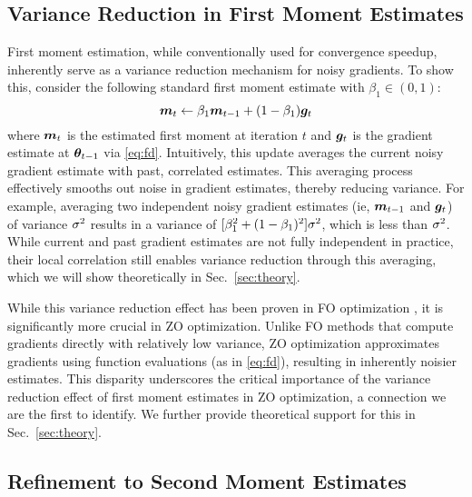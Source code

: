 \subsection{Variance Reduction in First Moment Estimates}\label{sec:1st-mo}
First moment estimation, while conventionally used for convergence speedup, inherently serve as a variance reduction mechanism for noisy gradients. To show this, consider the following standard first moment estimate with $\beta_1 \in (0,1)$:
\begin{equation}\label{eq:1st-mo}
{\bm{m}}_t \gets \beta_1{\bm{m}}_{t-1} + (1-\beta_1){\bm{g}}_{t}
\end{equation}
where ${\bm{m}}_t$ is the estimated first moment at iteration $t$ and ${\bm{g}}_t$ is the gradient estimate at ${\bm{\theta}}_{t-1}$ via \eqref{eq:fd}.  Intuitively, this update averages the current noisy gradient estimate with past, correlated estimates.
This averaging process effectively smooths out noise in gradient estimates, thereby reducing variance. For example, averaging two independent noisy gradient estimates (ie, ${\bm{m}}_{t-1}$ and ${\bm{g}}_t$) of variance $\sigma^{\smash{2}}$ results in a variance of $[\beta_1^{\smash{2}} + (1-\beta_1)^{\smash{2}}]\sigma^{\smash{2}}$, which is less than $\sigma^{\smash{2}}$. While current and past gradient estimates are not fully independent in practice, their local correlation still enables variance reduction through this averaging, which we will show theoretically in Sec.~\ref{sec:theory}.

While this variance reduction effect has been proven in FO optimization \citep{sgdm}, it is significantly more crucial in ZO optimization. Unlike FO methods that compute gradients directly with relatively low variance, ZO optimization approximates gradients using function evaluations (as in \eqref{eq:fd}), resulting in inherently noisier estimates. This disparity underscores the critical importance of the variance reduction effect of first moment estimates in ZO optimization, a connection we are the first to identify. We further provide theoretical support for this in Sec.~\ref{sec:theory}.



\subsection{Refinement to Second Moment Estimates}\label{sec:2nd-mo}

